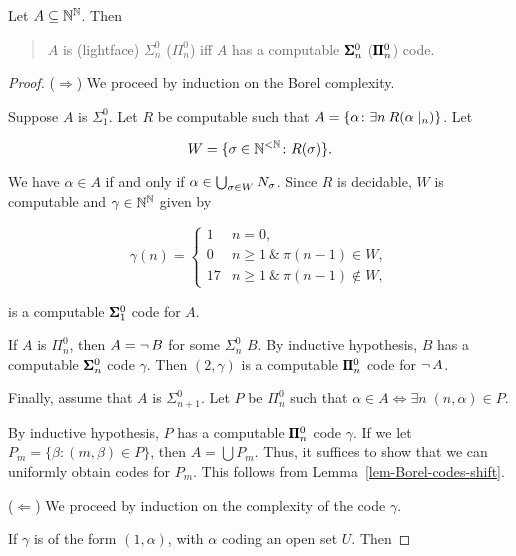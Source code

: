 \begin{proposition}\label{prop-computable-codes}Let $A \subseteq \mathbb{N}^{\mathbb{N}}$. Then

\begin{quote}
$A$ is (lightface) $\Sigma^0_n$ ($\Pi^0_n$) iff $A$ has a computable $\pmb{\Sigma}^0_n$ ($\pmb{\Pi}^0_n$) code.
\end{quote}

\end{proposition}\begin{proof}($\Rightarrow$) We proceed by induction on the Borel complexity.

Suppose $A$ is $\Sigma^0_1$. Let $R$ be computable such that $A = \{ \alpha \colon \exists n \: R(\alpha\mid_{n})\}$. Let

\begin{equation}
W = \{ \sigma \in \mathbb{N}^{<\mathbb{N}} \colon R(\sigma)\}.
\end{equation}

We have $\alpha \in A$ if and only if $\alpha \in \bigcup_{\sigma \in W} N_{\sigma}$.
Since $R$ is decidable, $W$ is computable and $\gamma \in \mathbb{N}^{\mathbb{N}}$ given by

\begin{equation}
\gamma(n) = 
	\begin{cases}
		1 & n = 0, \\
		0 & n \geq 1 \: \& \: \pi(n-1) \in W,\\
		17 & n \geq 1 \: \& \: \pi(n-1) \notin W, 
	\end{cases}
\end{equation}

is a computable $\pmb{\Sigma}^0_1$ code for $A$.

If $A$ is $\Pi^0_n$, then $A = \neg \, B$ for some $\Sigma^0_n$ $B$. By inductive hypothesis, $B$ has a computable $\pmb{\Sigma}^0_n$ code $\gamma$. Then $(2,\gamma)$ is a computable $\pmb{\Pi}^0_n$ code for $\neg \, A$.

Finally, assume that $A$ is $\Sigma^0_{n+1}$. Let $P$ be $\Pi^0_n$ such that $\alpha \in A \iff \exists n \; (n,\alpha) \in P$.

By inductive hypothesis, $P$ has a computable $\pmb{\Pi}^0_n$ code $\gamma$.
If we let $P_m = \{\beta \colon (m,\beta) \in P\}$, then $A = \bigcup P_m$. Thus, it suffices to show that we can uniformly obtain codes for $P_m$. This follows from Lemma~\ref{lem-Borel-codes-shift}.

($\Leftarrow$) We proceed by induction on the complexity of the code $\gamma$.

If $\gamma$ is of the form $(1,\alpha)$, with $\alpha$ coding an open set $U$. Then


\end{proof}
